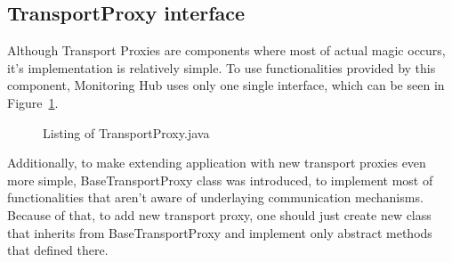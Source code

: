 \subsection{TransportProxy interface}
\label{subs:TransportProxyInterface}
Although Transport Proxies are components where most of actual magic occurs, it\rq{}s implementation is relatively simple. To use functionalities provided by this component, Monitoring Hub uses only one single interface, which can be seen in Figure~\ref{fig:transport_proxy}.

\begin{figure}[ht]
  \centering
  
  \caption{Listing of TransportProxy.java}
  \label{fig:transport_proxy}
\end{figure} 

Additionally, to make extending application with new transport proxies even more simple, BaseTransportProxy class was introduced, to implement most of functionalities that aren\rq{}t aware of underlaying communication mechanisms. Because of that, to add new transport proxy, one should just  create new class that inherits from BaseTransportProxy and implement only abstract methods that defined there.
